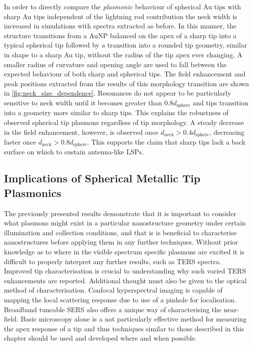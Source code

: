 \documentclass{article}
\begin{document}
In order to directly compare the \emph{plasmonic} behaviour of spherical Au tips with sharp Au tips independent of the lightning rod contribution the neck width is increased in simulations with spectra extracted as before. In this manner, the structure transitions from a AuNP balanced on the apex of a sharp tip into a typical spherical tip followed by a transition into a rounded tip geometry, similar in shape to a sharp Au tip, without the radius of the tip apex ever changing.
{\color{red}A smaller radius of curvature and opening angle are used to fall between the expected behaviour of both sharp and spherical tips.}
The field enhancement and peak positions extracted from the results of this morphology transition are shown in \autoref{fig:neck_size_dependence}. Resonances do not appear to be particularly sensitive to neck width until it becomes greater than $0.8d_{\mathrm{sphere}}$ and tips transition into a geometry more similar to sharp tips. This explains the robustness of observed spherical tip plasmons regardless of tip morphology. A steady decrease in the field enhancement, however, is observed once $d_{\mathrm{neck}}>0.4d_{\mathrm{sphere}}$, decreasing faster once $d_{\mathrm{neck}}>0.8d_{\mathrm{sphere}}$. This supports the claim that sharp tips lack a back surface on which to sustain antenna-like LSPs.

\subsection{Implications of Spherical Metallic Tip Plasmonics}

The previously presented results demonstrate that it is important to consider what plasmons might exist in a particular nanostructure geometry under certain illumination and collection conditions, and that is is beneficial to characterise nanostructures before applying them in any further techniques. Without prior knowledge as to where in the visible spectrum specific plasmons are excited it is difficult to properly interpret any further results, such as TERS spectra. Improved tip characterisation is crucial to understanding why such varied TERS enhancements are reported. Additional thought must also be given to the optical method of characterisation. Confocal hyperspectral imaging is capable of mapping the local scattering response due to use of a pinhole for localisation. Broadband tuneable SERS also offers a unique way of characterising the near-field. Basic microscopy alone is a not particularly effective method for measuring the apex response of a tip and thus techniques similar to those described in this chapter should be used and developed where and when possible.
\end{document}
